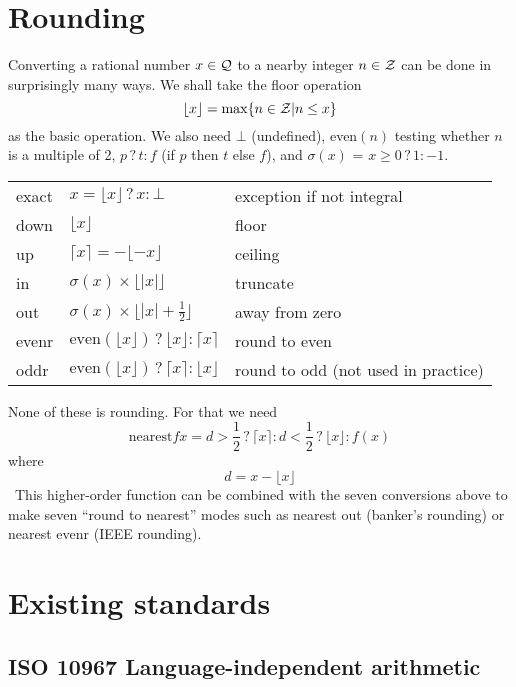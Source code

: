 \documentclass{article}
\begin{document}
\def\subI{${}_I$}
\def\subF{${}_F$}
\def\subD{${}_D$}
\def\ifso{\mathbin{?}}

\section{Rounding}

Converting a rational number $x \in {\cal Q}$ to a nearby
integer $n \in {\cal Z}$ can be done in surprisingly many
ways.  We shall take the floor operation
\[ \lfloor x \rfloor = \max \{n \in {\cal Z} | n \le x\} \]
as the basic operation.  We also need $\bot$ (undefined),
even$(n)$ testing whether $n$ is a multiple of 2,
$p \ifso t : f$ (if $p$ then $t$ else $f$), and $\sigma(x)$ =
$x\ge 0 \ifso 1 : -1$.

\begin{tabular}{lll}
exact & $x=\lfloor x\rfloor \ifso x : \bot$ & exception if not integral\\
down  & $\lfloor x \rfloor$             & floor\\
up    & $\lceil x \rceil = -\lfloor -x \rfloor$ & ceiling\\
in    & $\sigma(x)\times\lfloor|x|\rfloor$ & truncate\\
out   & $\sigma(x)\times\lfloor|x|+\frac12\rfloor$ & away from zero\\
evenr & $\mbox{even}(\lfloor x\rfloor) \ifso \lfloor x \rfloor
        : \lceil x \rceil$ & round to even\\
oddr  & $\mbox{even}(\lfloor x\rfloor) \ifso \lceil x \rceil
        : \lfloor x \rfloor$ & round to odd (not used in practice)
\end{tabular}

None of these is rounding.  For that we need
\[\mbox{nearest} f x = d > \frac12 \ifso \lceil x \rceil :
 d < \frac12 \ifso \lfloor x \rfloor : f(x) \]
\noindent where
\[ d = x - \lfloor x \rfloor \]
\
This higher-order function can be combined with the seven conversions
above to make seven ``round to nearest'' modes such as nearest out
(banker's rounding) or nearest evenr (IEEE rounding).

\section{Existing standards}

\subsection{ISO 10967 Language-independent arithmetic}
\end{document}
